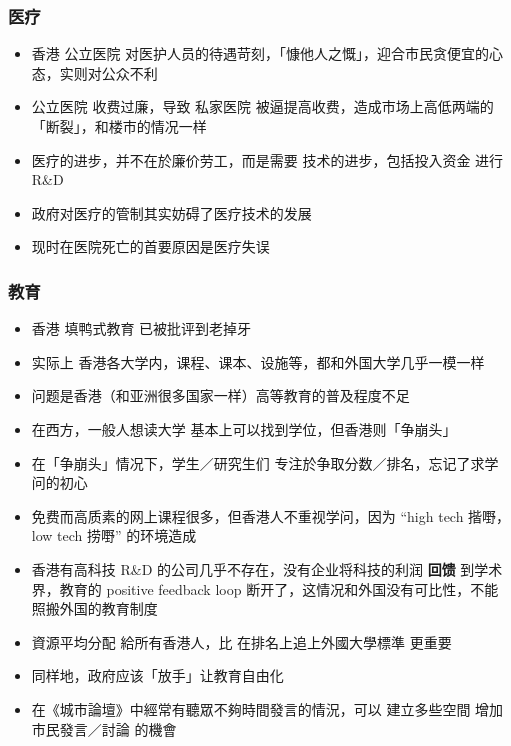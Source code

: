\documentclass[10pt]{beamer}
\newcommand{\emp}[1]{{\color{blue}\textbf{#1}}}
\newif\ifframeinlbf
\begin{document}
\frameinlbftrue
\begin{frame}
\frametitle{医疗}
\begin{itemize}
	\item 香港 公立医院 对医护人员的待遇苛刻，「慷他人之慨」，迎合市民贪便宜的心态，实则对公众不利
	
	\item 公立医院 收费过廉，导致 私家医院 被逼提高收费，造成市场上高低两端的「断裂」，和楼市的情况一样
	
	\item 医疗的进步，并不在於廉价劳工，而是需要 技术的进步，包括投入资金 进行 R\&D
	
	\item 政府对医疗的管制其实妨碍了医疗技术的发展
	
	\item 现时在医院死亡的首要原因是医疗失误
\end{itemize}
\end{frame}

\begin{frame}
\frametitle{教育}
\begin{itemize}
	\item 香港 填鸭式教育 已被批评到老掉牙
	
	\item 实际上 香港各大学内，课程、课本、设施等，都和外国大学几乎一模一样
	
	\item 问题是香港（和亚洲很多国家一样）高等教育的普及程度不足
	
	\item 在西方，一般人想读大学 基本上可以找到学位，但香港则「争崩头」 
	
	\item 在「争崩头」情况下，学生／研究生们 专注於争取分数／排名，忘记了求学问的初心 
	
	\item 免费而高质素的网上课程很多，但香港人不重视学问，因为 ``high tech 揩嘢，low tech 捞嘢'' 的环境造成
	
	\item 香港有高科技 R\&D 的公司几乎不存在，没有企业将科技的利润 \emp{回馈} 到学术界，教育的 positive feedback loop 断开了，这情况和外国没有可比性，不能照搬外国的教育制度
	
	\item 資源平均分配 給所有香港人，比 在排名上追上外國大學標準 更重要
	
	\item 同样地，政府应该「放手」让教育自由化
	
	\item 在《城市論壇》中經常有聽眾不夠時間發言的情況，可以 建立多些空間 增加市民發言／討論 的機會
\end{itemize}
\end{frame}
\end{document}
